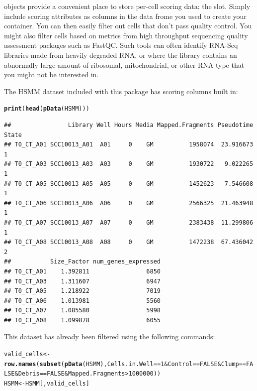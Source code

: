 \documentclass[10pt,oneside]{article}\usepackage[]{graphicx}\usepackage[]{color}
\makeatletter
\newcommand{\hlnum}[1]{\textcolor[rgb]{0.686,0.059,0.569}{#1}}%
\newcommand{\hlopt}[1]{\textcolor[rgb]{0,0,0}{#1}}%
\newcommand{\hlstd}[1]{\textcolor[rgb]{0.345,0.345,0.345}{#1}}%
\newcommand{\hlkwb}[1]{\textcolor[rgb]{0.69,0.353,0.396}{#1}}%
\newcommand{\hlkwd}[1]{\textcolor[rgb]{0.737,0.353,0.396}{\textbf{#1}}}%
\newenvironment{kframe}{%
 \def\at@end@of@kframe{}%
 \ifinner\ifhmode%
  \def\at@end@of@kframe{\end{minipage}}%
  \begin{minipage}{\columnwidth}%
 \fi\fi%
 \def\FrameCommand##1{\hskip\@totalleftmargin \hskip-\fboxsep
 \colorbox{shadecolor}{##1}\hskip-\fboxsep
     \hskip-\linewidth \hskip-\@totalleftmargin \hskip\columnwidth}%
 \MakeFramed {\advance\hsize-\width
   \@totalleftmargin\z@ \linewidth\hsize
   \@setminipage}}%
 {\par\unskip\endMakeFramed%
 \at@end@of@kframe}
\newenvironment{knitrout}{}{} %
\makeatother
\begin{document}
  objects provide a convenient place to store per-cell scoring data: the  slot.  Simply include scoring attributes as columns in the data frome you used to create your  container.  You can then easily filter out cells that don't pass quality control. You might also filter cells based on metrics from high throughput sequencing quality assessment packages such as FastQC. Such tools can often identify RNA-Seq libraries made from heavily degraded RNA, or where the library contains an abnormally large amount of ribosomal, mitochondrial, or other RNA type that you might not be interested in.
 
 The HSMM dataset included with this package has scoring columns built in: 
\begin{knitrout}
\color{fgcolor}\begin{kframe}
\begin{alltt}
\hlkwd{print}\hlstd{(}\hlkwd{head}\hlstd{(}\hlkwd{pData}\hlstd{(HSMM)))}
\end{alltt}
\begin{verbatim}
##                Library Well Hours Media Mapped.Fragments Pseudotime State
## T0_CT_A01 SCC10013_A01  A01     0    GM          1958074  23.916673     1
## T0_CT_A03 SCC10013_A03  A03     0    GM          1930722   9.022265     1
## T0_CT_A05 SCC10013_A05  A05     0    GM          1452623   7.546608     1
## T0_CT_A06 SCC10013_A06  A06     0    GM          2566325  21.463948     1
## T0_CT_A07 SCC10013_A07  A07     0    GM          2383438  11.299806     1
## T0_CT_A08 SCC10013_A08  A08     0    GM          1472238  67.436042     2
##           Size_Factor num_genes_expressed
## T0_CT_A01    1.392811                6850
## T0_CT_A03    1.311607                6947
## T0_CT_A05    1.218922                7019
## T0_CT_A06    1.013981                5560
## T0_CT_A07    1.085580                5998
## T0_CT_A08    1.099878                6055
\end{verbatim}
\end{kframe}
\end{knitrout}
 
 This dataset has already been filtered using the following commands: 
 
\begin{knitrout}
\color{fgcolor}\begin{kframe}
\begin{alltt}
\hlstd{valid_cells} \hlkwb{<-} \hlkwd{row.names}\hlstd{(}\hlkwd{subset}\hlstd{(}\hlkwd{pData}\hlstd{(HSMM), Cells.in.Well} \hlopt{==} \hlnum{1} \hlopt{&} \hlstd{Control} \hlopt{==} \hlnum{FALSE} \hlopt{&} \hlstd{Clump} \hlopt{==} \hlnum{FALSE} \hlopt{&} \hlstd{Debris} \hlopt{==} \hlnum{FALSE} \hlopt{&} \hlstd{Mapped.Fragments} \hlopt{>} \hlnum{1000000}\hlstd{))}
\hlstd{HSMM} \hlkwb{<-} \hlstd{HSMM[,valid_cells]}
\end{alltt}
\end{kframe}
\end{knitrout}
 
\end{document}
